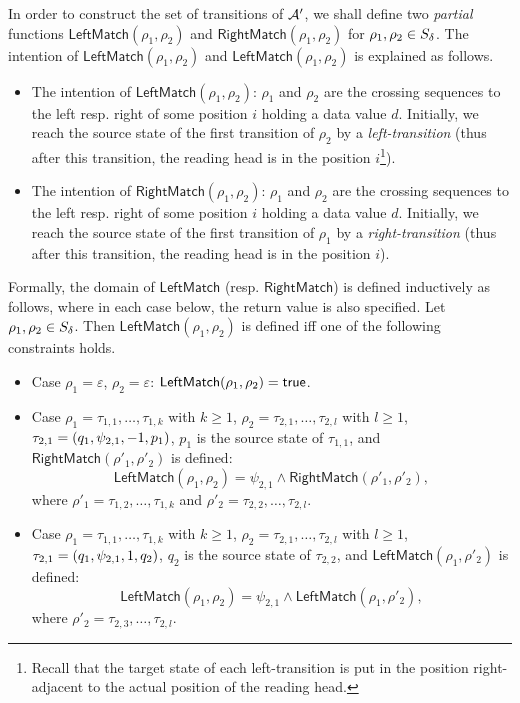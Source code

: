 \newcommand\lmatch{\mathsf{LeftMatch}}
\newcommand\rmatch{\mathsf{RightMatch}}

In order to construct the set of transitions of $\mathcal{A}'$, we shall define two \emph{partial} functions $\lmatch(\rho_1, \rho_2)$ and $\rmatch(\rho_1, \rho_2)$ for $\rho_1, \rho_2 \in S_{\delta}$. 
The intention of $\lmatch(\rho_1, \rho_2)$ and $\lmatch(\rho_1, \rho_2)$ is explained as follows.
\begin{itemize}
\item The intention of $\lmatch(\rho_1, \rho_2)$: $\rho_1$ and $\rho_2$ are the crossing sequences to the left resp. right of some position $i$ holding a data value $d$. Initially, we reach the source state of the first transition of $\rho_2$ by a \emph{left-transition} (thus after this transition, the reading head is in the position $i$\footnote{Recall that the target state of each left-transition is put in the position right-adjacent to the actual position of the reading head.}).
%
\item The intention of $\rmatch(\rho_1, \rho_2)$:  $\rho_1$ and $\rho_2$ are the crossing sequences to the left resp. right of some position $i$ holding a data value $d$. Initially, we reach the source state of the first transition of $\rho_1$ %
by a \emph{right-transition} (thus after this transition, the reading head is in the position $i$).
\end{itemize}
%
Formally, the domain of $\lmatch$ (resp. $\rmatch$) is defined inductively as follows, where in each case below, the return value is also specified. Let $\rho_1, \rho_2 \in S_{\delta}$. Then $\lmatch(\rho_1, \rho_2)$ is defined iff one of the following constraints holds.
\begin{itemize}
\item Case $\rho_1 = \varepsilon$, $\rho_2 = \varepsilon$: $\lmatch(\rho_1, \rho_2) = \ltrue$.
%
\item Case $\rho_1 =  \tau_{1,1}, \ldots, \tau_{1,k}$ with $k \ge 1$, $\rho_2 = \tau_{2,1}, \ldots, \tau_{2,l}$ with $l \ge 1$, $\tau_{2,1} = (q_1, \psi_{2,1}, -1, p_1)$, $p_1$ is the source state of $\tau_{1,1}$, and $\rmatch(\rho'_1, \rho'_2)$ is defined:  
$$\lmatch(\rho_1, \rho_2) = \psi_{2,1} \wedge \rmatch(\rho'_1, \rho'_2),$$ 
where $\rho'_1 = \tau_{1,2}, \ldots, \tau_{1,k}$ and $\rho'_2 = \tau_{2,2}, \ldots, \tau_{2,l}$.
%
\item Case $\rho_1 =  \tau_{1,1}, \ldots, \tau_{1,k}$ with $k \ge 1$, $\rho_2 = \tau_{2,1}, \ldots, \tau_{2,l}$ with $l \ge 1$, $\tau_{2,1} = (q_1, \psi_{2,1}, 1, q_2)$, $q_2$ is the source state of $\tau_{2,2}$, and $\lmatch(\rho_1, \rho'_2)$ is defined:  
$$\lmatch(\rho_1, \rho_2) = \psi_{2,1} \wedge \lmatch(\rho_1, \rho'_2),$$ 
where $\rho'_2 = \tau_{2,3}, \ldots, \tau_{2,l}$.
%
\end{itemize} 
